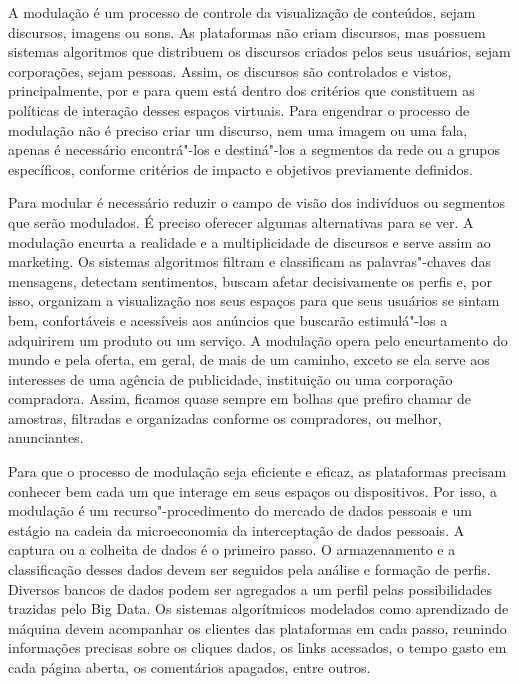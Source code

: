 A modulação é um processo de controle da visualização de conteúdos,
sejam discursos, imagens ou sons. As plataformas não criam discursos,
mas possuem sistemas algoritmos que distribuem os discursos criados
pelos seus usuários, sejam corporações, sejam pessoas. Assim, os
discursos são controlados e vistos, principalmente, por e para quem está
dentro dos critérios que constituem as políticas de interação desses
espaços virtuais. Para engendrar o processo de modulação não é preciso
criar um discurso, nem uma imagem ou uma fala, apenas é necessário
encontrá"-los e destiná"-los a segmentos da rede ou a grupos específicos,
conforme critérios de impacto e objetivos previamente definidos.

Para modular é necessário reduzir o campo de visão dos indivíduos ou
segmentos que serão modulados. É preciso oferecer algumas alternativas
para se ver. A modulação encurta a realidade e a multiplicidade de
discursos e serve assim ao marketing. Os sistemas algoritmos filtram e
classificam as palavras"-chaves das mensagens, detectam sentimentos,
buscam afetar decisivamente os perfis e, por isso, organizam a
visualização nos seus espaços para que seus usuários se sintam bem,
confortáveis e acessíveis aos anúncios que buscarão estimulá"-los a
adquirirem um produto ou um serviço. A modulação opera pelo encurtamento
do mundo e pela oferta, em geral, de mais de um caminho, exceto se ela
serve aos interesses de uma agência de publicidade, instituição ou uma
corporação compradora. Assim, ficamos quase sempre em bolhas que prefiro
chamar de amostras, filtradas e organizadas conforme os compradores, ou
melhor, anunciantes.

Para que o processo de modulação seja eficiente e eficaz, as plataformas
precisam conhecer bem cada um que interage em seus espaços ou
dispositivos. Por isso, a modulação é um recurso"-procedimento do mercado
de dados pessoais e um estágio na cadeia da microeconomia da
interceptação de dados pessoais. A captura ou a colheita de dados é o
primeiro passo. O armazenamento e a classificação desses dados devem ser
seguidos pela análise e formação de perfis. Diversos bancos de dados
podem ser agregados a um perfil pelas possibilidades trazidas pelo Big
Data. Os sistemas algorítmicos modelados como aprendizado de máquina
devem acompanhar os clientes das plataformas em cada passo, reunindo
informações precisas sobre os cliques dados, os links acessados, o tempo
gasto em cada página aberta, os comentários apagados, entre outros.

